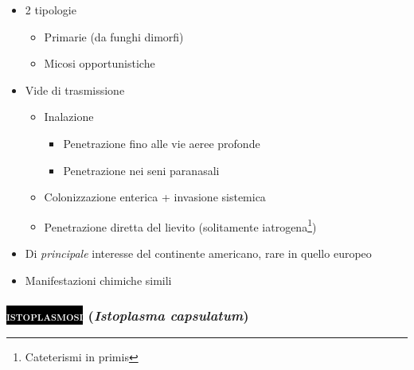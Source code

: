 \documentclass[italian,]{article}
\providecommand{\tightlist}{%
  \setlength{\itemsep}{0pt}\setlength{\parskip}{0pt}}
\newcommand{\pat}[1]{\colorbox{black}{\textcolor{white}{\textsc{#1}}}}
\begin{document}
\begin{itemize}
\tightlist
\item
  2 tipologie

  \begin{itemize}
  \tightlist
  \item
    Primarie (da funghi dimorfi)
  \item
    Micosi opportunistiche
  \end{itemize}
\item
  Vide di trasmissione

  \begin{itemize}
  \tightlist
  \item
    Inalazione

    \begin{itemize}
    \tightlist
    \item
      Penetrazione fino alle vie aeree profonde
    \item
      Penetrazione nei seni paranasali
    \end{itemize}
  \item
    Colonizzazione enterica + invasione sistemica
  \item
    Penetrazione diretta del lievito (solitamente iatrogena\footnote{Cateterismi
      in primis})
  \end{itemize}
\item
  Di \emph{principale} interesse del continente americano, rare in
  quello europeo
\item
  Manifestazioni chimiche simili
\end{itemize}

\hypertarget{istoplasma-capsulatum}{%
\subsubsection{\texorpdfstring{\pat{istoplasmosi} (\emph{Istoplasma
capsulatum})}{ (Istoplasma capsulatum)}}\label{istoplasma-capsulatum}}
\end{document}
